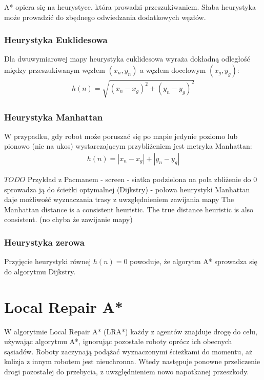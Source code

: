 A* opiera się na heurystyce, która prowadzi przeszukiwaniem. Słaba heurystyka może prowadzić do zbędnego odwiedzania dodatkowych węzłów.

\subsubsection{Heurystyka Euklidesowa}
Dla dwuwymiarowej mapy heurystyka euklidesowa wyraża dokładną odległość między przeszukiwanym węzłem $(x_n, y_n)$ a węzłem docelowym $(x_g, y_g)$:
\begin{gather}
 	h(n) = \sqrt{(x_n - x_g)^2 + (y_n - y_g)^2}
 	\label{eq_astar_heu_euc} 
\end{gather}

\subsubsection{Heurystyka Manhattan}
W przypadku, gdy robot może poruszać się po mapie jedynie poziomo lub pionowo (nie na ukos) wystarczającym przybliżeniem jest metryka Manhattan:
\begin{gather}
 	h(n) = |x_n - x_g| + |y_n - y_g|
 	\label{eq_astar_heu_man} 
\end{gather}

$TODO$ Przykład z Pacmanem - screen - siatka podzielona na pola
zbliżenie do 0 sprowadza ją do ścieżki optymalnej (Dijkstry) - połowa heurystyki Manhattan daje możliwość wyznaczania trasy z uwzględnieniem zawijania mapy
The Manhattan distance is a consistent heuristic. The true distance heuristic is also consistent. (no chyba że zawijanie mapy)

\subsubsection{Heurystyka zerowa}
Przyjęcie heurystyki równej $h(n) = 0$ powoduje, że algorytm A* sprowadza się do algorytmu Dijkstry.

\section{Local Repair A*}
W algorytmie Local Repair A* (LRA*) każdy z agentów znajduje drogę do celu, używając algorytmu A*, ignorując pozostałe roboty oprócz ich obecnych sąsiadów. Roboty zaczynają podążać wyznaczonymi ścieżkami do momentu, aż kolizja z innym robotem jest nieuchronna. Wtedy następuje ponowne przeliczenie drogi pozostałej do przebycia, z uwzględnieniem nowo napotkanej przeszkody.

